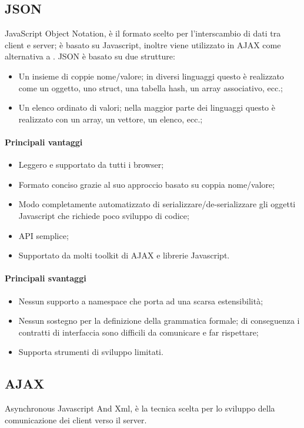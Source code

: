 \documentclass[../PianoDiQualifica.tex]{subfiles}
\begin{document}
		\subsection{JSON}
			JavaScript Object Notation, è il formato scelto per l'interscambio di dati tra client e
			server; è basato su Javascript, inoltre viene utilizzato in AJAX come alternativa a . JSON è basato su due strutture:
			\begin{itemize}
				\item Un insieme di coppie nome/valore; in diversi linguaggi questo è realizzato come
				un oggetto, uno struct, una tabella hash, un array associativo, ecc.;
				\item Un elenco ordinato di valori; nella maggior parte dei linguaggi questo è
				realizzato con un array, un vettore, un elenco, ecc.;
			\end{itemize}
			\paragraph{Principali vantaggi}
			\begin{itemize}
					\item Leggero e supportato da tutti i browser;
					\item Formato conciso grazie al suo approccio basato su coppia nome/valore;
					\item Modo completamente automatizzato di serializzare/de-serializzare gli oggetti
					Javascript che richiede poco sviluppo di codice;
					\item API semplice;
					\item Supportato da molti toolkit di AJAX e librerie Javascript.
				\end{itemize}
			\paragraph{Principali svantaggi}
				\begin{itemize}
					\item Nessun supporto a namespace che porta ad una scarsa estensibilità;
					\item Nessun sostegno per la definizione della grammatica formale; di conseguenza
					i contratti di interfaccia sono difficili da comunicare e far rispettare;
					\item Supporta strumenti di sviluppo limitati.
				\end{itemize}
		\subsection{AJAX}
			Asynchronous Javascript And Xml, è la tecnica scelta per lo sviluppo della comunicazione
			dei client verso il server.
\end{document}
